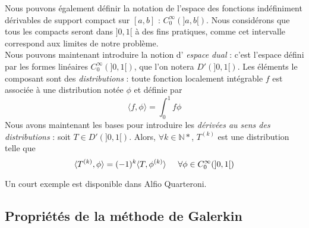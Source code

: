 \documentclass[12pt]{article}
\newcommand{\N}{\mathbb N}
\newcommand{\espace}{\hspace{5mm}}
\begin{document}
Nous pouvons également définir la notation de l'espace des fonctions indéfiniment dérivables de support compact sur $[a,b]$ : $C_0^\infty (]a,b[)$. Nous considérons que tous les compacts seront dans $]0,1[$ à des fins pratiques, comme cet intervalle correspond aux limites de notre problème.\\
Nous pouvons maintenant introduire la notion d' \emph{espace dual} : c'est l'espace défini par les formes linéaires $C_0^\infty (]0,1[)$, que l'on notera $D'(]0,1[)$. Les éléments le composant sont des \emph{distributions} : toute fonction localement intégrable $f$ est associée à une distribution notée $\phi$ et définie par
\begin{equation}
\langle f, \phi \rangle = \int_0^1 f \phi
\end{equation}
Nous avons maintenant les bases pour introduire les \emph{dérivées au sens des distributions} : soit $T \in D'(]0,1[)$. Alors, $\forall k \in \N *$, $T^{(k)}$ est une distribution telle que 
\begin{equation}
\langle T^{(k)}, \phi \rangle = (-1)^k \langle T, \phi^{(k)} \rangle \espace \forall \phi \in C_0^\infty(]0,1[)
\end{equation}

Un court exemple est disponible dans Alfio Quarteroni.

\subsection{Propriétés de la méthode de Galerkin}
\end{document}
